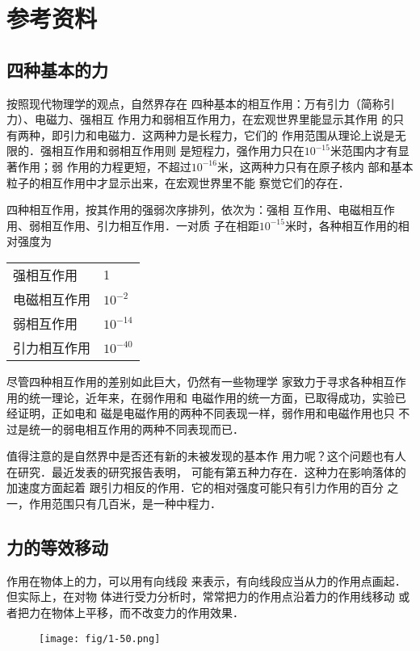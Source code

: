 \section{参考资料}
\subsection{四种基本的力}
按照现代物理学的观点，自然界存在
四种基本的相互作用：万有引力（简称引力）、电磁力、强相互
作用力和弱相互作用力，在宏观世界里能显示其作用
的只有两种，即引力和电磁力．这两种力是长程力，它们的
作用范围从理论上说是无限的．强相互作用和弱相互作用则
是短程力，强作用力只在$10^{-15}$米范围内才有显著作用；弱
作用的力程更短，不超过$10^{-16}$米，这两种力只有在原子核内
部和基本粒子的相互作用中才显示出来，在宏观世界里不能
察觉它们的存在．

四种相互作用，按其作用的强弱次序排列，依次为：强相
互作用、电磁相互作用、弱相互作用、引力相互作用．一对质
子在相距$10^{-15}$米时，各种相互作用的相对强度为
\begin{center}
    \begin{tabular}{p{}l}
  强相互作用&1\\
电磁相互作用&$10^{-2}$\\
弱相互作用&$10^{-14}$\\
引力相互作用&$10^{-40}$ 
    \end{tabular}
\end{center}

尽管四种相互作用的差别如此巨大，仍然有一些物理学
家致力于寻求各种相互作用的统一理论，近年来，在弱作用和
电磁作用的统一方面，已取得成功，实验已经证明，正如电和
磁是电磁作用的两种不同表现一样，弱作用和电磁作用也只
不过是统一的弱电相互作用的两种不同表现而已．

值得注意的是自然界中是否还有新的未被发现的基本作
用力呢？这个问题也有人在研究．最近发表的研究报告表明，
可能有第五种力存在．这种力在影响落体的加速度方面起着
跟引力相反的作用．它的相对强度可能只有引力作用的百分
之一，作用范围只有几百米，是一种中程力．

\subsection{力的等效移动}

作用在物体上的力，可以用有向线段
来表示，有向线段应当从力的作用点画起．但实际上，在对物
体进行受力分析时，常常把力的作用点沿着力的作用线移动
或者把力在物体上平移，而不改变力的作用效果．

\begin{figure}[htp]
    \centering
\texttt{[image: fig/1-50.png]}
    \caption{}
\end{figure}

